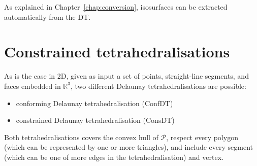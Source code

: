 As explained in Chapter~\ref{chap:conversion}, isosurfaces can be extracted automatically from the DT\@.


%
\section[Adding constraints]{Constrained tetrahedralisations}%
\label{sec:cdt}


As is the case in 2D, given as input a set of points, straight-line segments, and faces embedded in $\mathbb{R}^3$, two different Delaunay tetrahedralisations are possible:
\begin{itemize}
  \item conforming Delaunay tetrahedralisation (ConfDT)
  \item constrained Delaunay tetrahedralisation (ConsDT)
\end{itemize}
Both tetrahedralisations covers the convex hull of $\mathcal{P}$, respect every polygon (which can be represented by one or more triangles), and include every segment (which can be one of more edges in the tetrahedralisation) and vertex.

%

